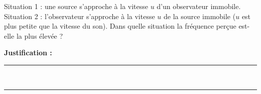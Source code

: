 Situation 1 : une source s'approche à la vitesse $u$ d'un observateur immobile. Situation 2 : l'observateur s'approche à la vitesse $u$ de la source immobile ($u$ est plus petite que la vitesse du son). Dans quelle situation la fréquence perçue est-elle la plus élevée ?

\choices

\noindent\textbf{Justification :} \hrulefill \\[2.5ex]
\rule{\linewidth}{0.4pt} \\[2.5ex]
\rule{\linewidth}{0.4pt}
\vfill
